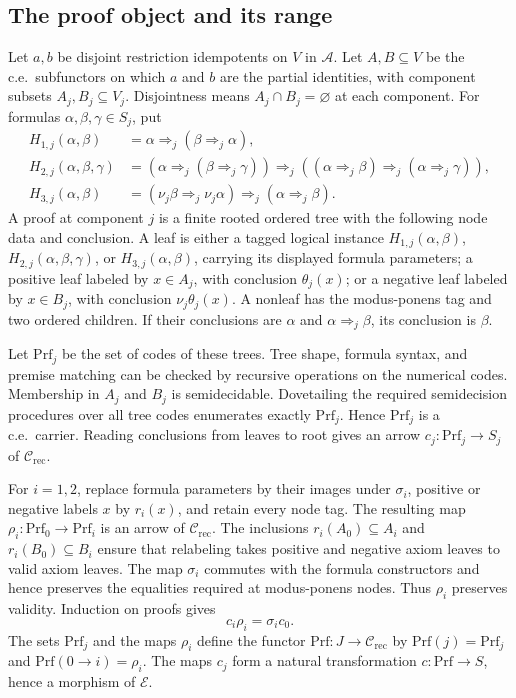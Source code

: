 \documentclass[11pt]{article}
\begin{document}
\subsection{The proof object and its range}

Let $a,b$ be disjoint restriction idempotents on $V$ in $\mathcal A$.
Let $A,B\subseteq V$ be the c.e.\ subfunctors on which
$a$ and $b$ are the partial identities, with component subsets
$A_j,B_j\subseteq V_j$. Disjointness
means $A_j\cap B_j=\varnothing$ at each component.
For formulas $\alpha,\beta,\gamma\in S_j$, put
\begin{align*}
 H_{1,j}(\alpha,\beta)
   &=\alpha\Rightarrow_j(\beta\Rightarrow_j\alpha),\\
 H_{2,j}(\alpha,\beta,\gamma)
   &=(\alpha\Rightarrow_j(\beta\Rightarrow_j\gamma))
     \Rightarrow_j((\alpha\Rightarrow_j\beta)
                          \Rightarrow_j(\alpha\Rightarrow_j\gamma)),\\
 H_{3,j}(\alpha,\beta)
   &=(\nu_j\beta\Rightarrow_j\nu_j\alpha)
                          \Rightarrow_j(\alpha\Rightarrow_j\beta).
\end{align*}
A proof at component $j$ is a finite rooted ordered tree with
the following node data and conclusion. A leaf is either a
tagged logical instance $H_{1,j}(\alpha,\beta)$,
$H_{2,j}(\alpha,\beta,\gamma)$, or
$H_{3,j}(\alpha,\beta)$, carrying its displayed formula
parameters; a positive leaf labeled by $x\in A_j$, with
conclusion $\theta_j(x)$; or a negative leaf labeled by
$x\in B_j$, with conclusion $\nu_j\theta_j(x)$.
A nonleaf has the modus-ponens tag and two ordered children.
If their conclusions are $\alpha$ and
$\alpha\Rightarrow_j\beta$, its conclusion is $\beta$.

Let $\mathrm{Prf}_j$ be the set of codes of these trees.
Tree shape, formula syntax, and premise matching can be checked
by recursive operations on the numerical codes. Membership in
$A_j$ and $B_j$ is semidecidable. Dovetailing the required semidecision
procedures over all tree codes enumerates exactly $\mathrm{Prf}_j$.
Hence $\mathrm{Prf}_j$ is a c.e.\ carrier.
Reading conclusions from leaves to root gives an arrow
$c_j:\mathrm{Prf}_j\to S_j$ of $\mathcal C_{\mathrm{rec}}$.

For $i=1,2$, replace formula parameters by their images under
$\sigma_i$, positive or negative labels $x$ by $r_i(x)$, and
retain every node tag. The resulting map
$\rho_i:\mathrm{Prf}_0\to\mathrm{Prf}_i$ is an arrow of
$\mathcal C_{\mathrm{rec}}$.
The inclusions $r_i(A_0)\subseteq A_i$ and $r_i(B_0)\subseteq B_i$
ensure that relabeling takes positive and negative axiom leaves to
valid axiom leaves. The map $\sigma_i$ commutes with the formula
constructors and hence preserves the equalities required at
modus-ponens nodes. Thus $\rho_i$ preserves validity.
Induction on proofs gives
\[
 c_i\rho_i=\sigma_i c_0.
\]
The sets $\mathrm{Prf}_j$ and the maps $\rho_i$ define the functor
$\mathrm{Prf}:J\to\mathcal C_{\mathrm{rec}}$ by
$\mathrm{Prf}(j)=\mathrm{Prf}_j$ and
$\mathrm{Prf}(0\to i)=\rho_i$. The maps $c_j$ form a
natural transformation $c:\mathrm{Prf}\to S$, hence a morphism of
$\mathcal E$.
\end{document}
